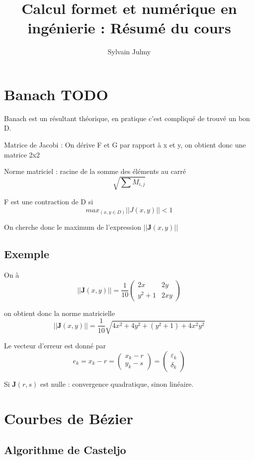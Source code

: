 \documentclass[11pt,a4paper]{report}
\author{Sylvain Julmy}
\title{Calcul formet et numérique en ingénierie : Résumé du cours}
\begin{document}
\maketitle

\tableofcontents

\chapter{Banach TODO}

Banach est un résultant théorique, en pratique c'est compliqué de trouvé un bon D.

Matrice de Jacobi : On dérive F et G par rapport à x et y, on obtient donc une matrice 2x2

Norme matriciel : racine de la somme des éléments au carré
$$\sqrt{\sum{M_{i,j}}}$$

F est une contraction de D si
$$
max_{(x,y\in D)} ||J(x,y)|| < 1
$$

On cherche donc le maximum de l'expression $||\textbf{J}(x,y)||$
\section{Exemple}
On à $$||\textbf{J}(x,y)|| = \frac{1}{10}(\begin{array}{cc}
2x & 2y \\ 
y^2+1 & 2xy
\end{array})$$

on obtient donc la norme matricielle
$$
||\textbf{J}(x,y)|| = \frac{1}{10}\sqrt{4x^2+4y^2+(y^2+1)+4x^2y^2}
$$

Le vecteur d'erreur est donné par
$$
e_k = x_k - r = (\begin{array}{c}
x_k-r \\ 
y_k-s
\end{array} ) = (\begin{matrix}
\varepsilon_k \\ 
\delta_k
\end{matrix})
$$

Si $\textbf{J}(r,s)$ est nulle : convergence quadratique, sinon linéaire.

\chapter{Courbes de Bézier}

\section{Algorithme de Casteljo}
\end{document}
